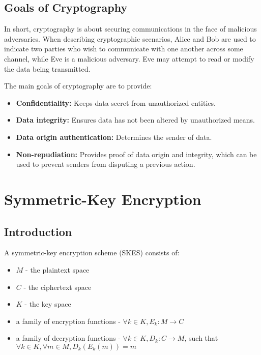 \documentclass[12pt,titlepage]{article}
\let\stdsection\section
\renewcommand\section{\clearpage\stdsection}
\begin{document}
    \subsection{Goals of Cryptography}
      In short, cryptography is about securing communications in the face of malicious adversaries.
      When describing cryptographic scenarios, Alice and Bob are used to indicate two parties who wish
      to communicate with one another across some channel, while Eve is a malicious adversary. Eve may
      attempt to read or modify the data being transmitted.

      The main goals of cryptography are to provide:
      \begin{itemize}
        \item \textbf{Confidentiality:} Keeps data secret from unauthorized entities.
        \item \textbf{Data integrity:} Ensures data has not been altered by unauthorized means.
        \item \textbf{Data origin authentication:} Determines the sender of data.
        \item \textbf{Non-repudiation:} Provides proof of data origin and integrity, which can be
          used to prevent senders from disputing a previous action.
      \end{itemize}

  \section{Symmetric-Key Encryption}

    \subsection{Introduction}
      A symmetric-key encryption scheme (SKES) consists of:
      \begin{itemize}
        \item $M$ - the plaintext space
        \item $C$ - the ciphertext space
        \item $K$ - the key space
        \item a family of encryption functions - $\forall k \in K, E_k : M \rightarrow C$
        \item a family of decryption functions - $\forall k \in K, D_k : C \rightarrow M$, such that
          $\forall k \in K, \forall m \in M, D_k(E_k(m)) = m$
      \end{itemize}
\end{document}
